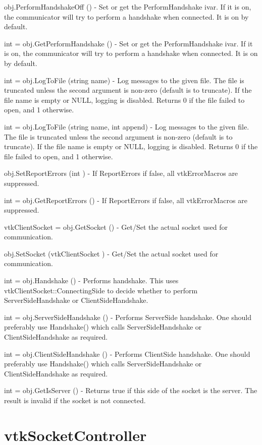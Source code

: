 \begin{DoxyItemize}
\item {\ttfamily obj.\-Perform\-Handshake\-Off ()} -\/ Set or get the Perform\-Handshake ivar. If it is on, the communicator will try to perform a handshake when connected. It is on by default.  
\item {\ttfamily int = obj.\-Get\-Perform\-Handshake ()} -\/ Set or get the Perform\-Handshake ivar. If it is on, the communicator will try to perform a handshake when connected. It is on by default.  
\item {\ttfamily int = obj.\-Log\-To\-File (string name)} -\/ Log messages to the given file. The file is truncated unless the second argument is non-\/zero (default is to truncate). If the file name is empty or N\-U\-L\-L, logging is disabled. Returns 0 if the file failed to open, and 1 otherwise.  
\item {\ttfamily int = obj.\-Log\-To\-File (string name, int append)} -\/ Log messages to the given file. The file is truncated unless the second argument is non-\/zero (default is to truncate). If the file name is empty or N\-U\-L\-L, logging is disabled. Returns 0 if the file failed to open, and 1 otherwise.  
\item {\ttfamily obj.\-Set\-Report\-Errors (int )} -\/ If Report\-Errors if false, all vtk\-Error\-Macros are suppressed.  
\item {\ttfamily int = obj.\-Get\-Report\-Errors ()} -\/ If Report\-Errors if false, all vtk\-Error\-Macros are suppressed.  
\item {\ttfamily vtk\-Client\-Socket = obj.\-Get\-Socket ()} -\/ Get/\-Set the actual socket used for communication.  
\item {\ttfamily obj.\-Set\-Socket (vtk\-Client\-Socket )} -\/ Get/\-Set the actual socket used for communication.  
\item {\ttfamily int = obj.\-Handshake ()} -\/ Performs handshake. This uses vtk\-Client\-Socket\-::\-Connecting\-Side to decide whether to perform Server\-Side\-Handshake or Client\-Side\-Handshake.  
\item {\ttfamily int = obj.\-Server\-Side\-Handshake ()} -\/ Performs Server\-Side handshake. One should preferably use Handshake() which calls Server\-Side\-Handshake or Client\-Side\-Handshake as required.  
\item {\ttfamily int = obj.\-Client\-Side\-Handshake ()} -\/ Performs Client\-Side handshake. One should preferably use Handshake() which calls Server\-Side\-Handshake or Client\-Side\-Handshake as required.  
\item {\ttfamily int = obj.\-Get\-Is\-Server ()} -\/ Returns true if this side of the socket is the server. The result is invalid if the socket is not connected.  
\end{DoxyItemize}\hypertarget{vtkparallel_vtksocketcontroller}{}\section{vtk\-Socket\-Controller}\label{vtkparallel_vtksocketcontroller}
